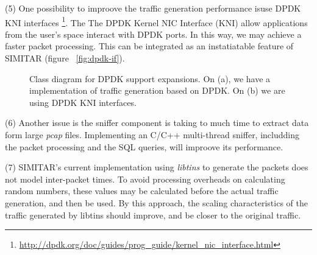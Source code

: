 (5) One possibility to improove the traffic generation performance isuse DPDK KNI interfaces \footnote{\href{http://dpdk.org/doc/guides/prog_guide/kernel_nic_interface.html}{http://dpdk.org/doc/guides/prog\_guide/kernel\_nic\_interface.html}}. The The DPDK Kernel NIC Interface (KNI) allow applications from the user's space interact with DPDK ports. In this way, we may achieve a faster packet processing. This can be integrated as an instatiatable feature of SIMITAR (figure ~\ref{fig:dpdk-if}).


\begin{figure}[h!]
	\centering
	\hspace{0mm}
	\caption{Class diagram for DPDK support expansions. On (a), we have a implementation of traffic generation based on DPDK. On (b) we are using DPDK KNI interfaces.}
	\label{fig:DpdkFlow}
\end{figure}


(6) Another issue is the sniffer component is taking to much time to extract data form large \textit{pcap} files. Implementing an C/C++ multi-thread sniffer, includding the packet processing and the SQL queries, will improove its performance. 


(7) SIMITAR's current implementation using \textit{libtins} to generate the packets does not model inter-packet times. To avoid processing overheads on calculating random numbers, these values may be calculated before the actual traffic generation, and then be used. By this approach, the scaling characteristics of the traffic generated by libtins should improve, and be closer to the original traffic. 

